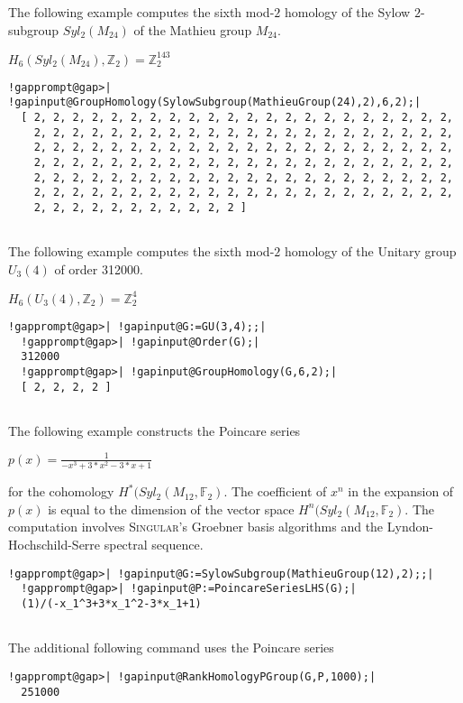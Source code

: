 \documentclass[a4paper,11pt]{report}
\begin{document}
{{{\begin{Verbatim}[commandchars=!@|,fontsize=\small,frame=single,label=Example]
\end{Verbatim}
 

The following example computes the sixth mod-$2$ homology of the Sylow $2$-subgroup $Syl_2(M_{24})$ of the Mathieu group $M_{24}$. 

$H_6(Syl_2(M_{24}),\mathbb Z_2) = \mathbb Z_2^{143}$ 
\begin{Verbatim}[commandchars=!@|,fontsize=\small,frame=single,label=Example]
  !gapprompt@gap>| !gapinput@GroupHomology(SylowSubgroup(MathieuGroup(24),2),6,2);|
  [ 2, 2, 2, 2, 2, 2, 2, 2, 2, 2, 2, 2, 2, 2, 2, 2, 2, 2, 2, 2, 2, 2, 
    2, 2, 2, 2, 2, 2, 2, 2, 2, 2, 2, 2, 2, 2, 2, 2, 2, 2, 2, 2, 2, 2, 
    2, 2, 2, 2, 2, 2, 2, 2, 2, 2, 2, 2, 2, 2, 2, 2, 2, 2, 2, 2, 2, 2, 
    2, 2, 2, 2, 2, 2, 2, 2, 2, 2, 2, 2, 2, 2, 2, 2, 2, 2, 2, 2, 2, 2, 
    2, 2, 2, 2, 2, 2, 2, 2, 2, 2, 2, 2, 2, 2, 2, 2, 2, 2, 2, 2, 2, 2, 
    2, 2, 2, 2, 2, 2, 2, 2, 2, 2, 2, 2, 2, 2, 2, 2, 2, 2, 2, 2, 2, 2, 
    2, 2, 2, 2, 2, 2, 2, 2, 2, 2, 2 ]
  
\end{Verbatim}
 

The following example computes the sixth mod-$2$ homology of the Unitary group $U_3(4)$ of order 312000. 

$H_6(U_3(4),\mathbb Z_2) = \mathbb Z_2^{4}$ 
\begin{Verbatim}[commandchars=!@|,fontsize=\small,frame=single,label=Example]
  !gapprompt@gap>| !gapinput@G:=GU(3,4);;|
  !gapprompt@gap>| !gapinput@Order(G);|
  312000
  !gapprompt@gap>| !gapinput@GroupHomology(G,6,2);|
  [ 2, 2, 2, 2 ]
  
\end{Verbatim}
 

The following example constructs the Poincare series 

$p(x)=\frac{1}{-x^3+3*x^2-3*x+1}$ 

for the cohomology $H^\ast(Syl_2(M_{12},\mathbb F_2)$. The coefficient of $x^n$ in the expansion of $p(x)$ is equal to the dimension of the vector space $H^n(Syl_2(M_{12},\mathbb F_2)$. The computation involves \textsc{Singular}'s Groebner basis algorithms and the Lyndon-Hochschild-Serre spectral
sequence. 
\begin{Verbatim}[commandchars=!@|,fontsize=\small,frame=single,label=Example]
  !gapprompt@gap>| !gapinput@G:=SylowSubgroup(MathieuGroup(12),2);;|
  !gapprompt@gap>| !gapinput@P:=PoincareSeriesLHS(G);|
  (1)/(-x_1^3+3*x_1^2-3*x_1+1)
  
\end{Verbatim}
 The additional following command uses the Poincare series 
\begin{Verbatim}[commandchars=!@|,fontsize=\small,frame=single,label=Example]
  !gapprompt@gap>| !gapinput@RankHomologyPGroup(G,P,1000);|
  251000
  

\end{Verbatim}}}}
\end{document}
